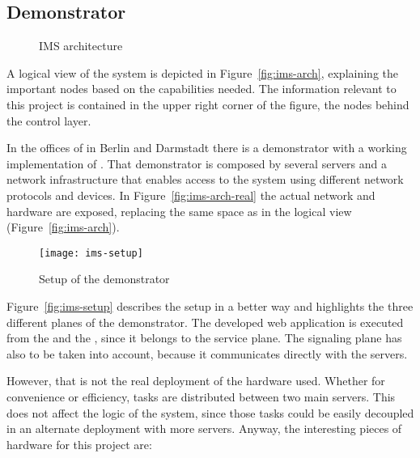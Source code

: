 \subsection{ Demonstrator} %
\label{sub:demonstrator}

\begin{figure}[htbp]
  \centering
  \caption{IMS architecture}
  \label{fig:ims}
\end{figure}

A logical view of the system is depicted in Figure~\vref{fig:ims-arch}, explaining the important nodes based on the capabilities needed.
The information relevant to this project is contained in the upper right corner of the figure, the nodes behind the control layer.

In the offices of  in Berlin and Darmstadt there is a demonstrator with a working implementation of .
That demonstrator is composed by several servers and a network infrastructure that enables access to the system using different network protocols and devices.
In Figure~\vref{fig:ims-arch-real} the actual network and hardware are exposed, replacing the same space as in the logical view (Figure~\vref{fig:ims-arch}).

\begin{figure}[htbp]
  \centering
    \texttt{[image: ims-setup]}
  \caption{Setup of the demonstrator}
  \label{fig:ims-setup}
\end{figure}

Figure~\vref{fig:ims-setup} describes the setup in a better way and highlights the three different planes of the demonstrator.
The developed web application is executed from the  and the , since it belongs to the service plane.
The signaling plane has also to be taken into account, because it communicates directly with the servers.

However, that is not the real deployment of the hardware used.
Whether for convenience or efficiency, tasks are distributed between two main servers.
This does not affect the logic of the system, since those tasks could be easily decoupled in an alternate deployment with more servers.
Anyway, the interesting pieces of hardware for this project are:

